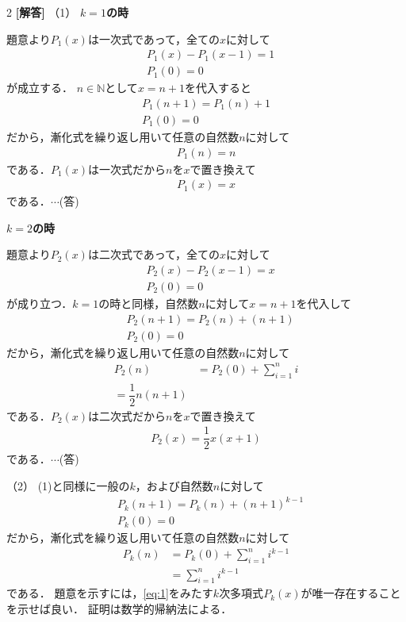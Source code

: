 \documentclass[../../main.tex]{subfiles}
\begin{document}
\setcounter{equation}{0}
\begin{oframed}
  
\end{oframed}
\setlength{\columnseprule}{0.4pt}
\begin{multicols}{2}
  {\bf [解答]}
  （1）
  \textbf{$k=1$の時}

  題意より$P_1(x)$は一次式であって，全ての$x$に対して
  \begin{align}
    & P_1(x) - P_1(x-1) = 1 \\
    & P_1(0) = 0
  \end{align}
  が成立する．
  $n \in \mathbb{N}$として$x=n+1$を代入すると
  \begin{align}
    P_1(n+1) = P_1(n) + 1 \\
    P_1(0) = 0
  \end{align}
  だから，漸化式を繰り返し用いて任意の自然数$n$に対して
  \begin{align}
    P_1(n) = n
  \end{align}
  である．$P_1(x)$は一次式だから$n$を$x$で置き換えて
  \begin{align}
    P_1(x) = x
  \end{align}
  である．$\cdots$(答)

  \textbf{$k=2$の時}

  題意より$P_2(x)$は二次式であって，全ての$x$に対して
  \begin{align}
    & P_2(x) - P_2(x-1) = x \\
    & P_2(0) = 0
  \end{align}
  が成り立つ．$k=1$の時と同様，自然数$n$に対して$x=n+1$を代入して
  \begin{align}
    & P_2(n+1) = P_2(n) + (n+1) \\
    & P_2(0) = 0
  \end{align}
  だから，漸化式を繰り返し用いて任意の自然数$n$に対して
  \begin{align}
    P_2(n)
    & = P_2(0) + \sum_{i=1}^{n} i \\
    = \dfrac{1}{2}n(n+1)
  \end{align}
  である．$P_2(x)$は二次式だから$n$を$x$で置き換えて
  \begin{align}
    P_2(x) = \dfrac{1}{2}x(x+1)
  \end{align}
  である．$\cdots$(答)

  （2）
  (1)と同様に一般の$k$，および自然数$n$に対して
  \begin{align}
    & P_k(n+1) = P_k(n) + (n+1)^{k-1} \\
    & P_k(0) = 0
  \end{align}
  だから，漸化式を繰り返し用いて任意の自然数$n$に対して
  \begin{align}
    P_k(n)
    & = P_k(0) + \sum_{i=1}^n i^{k-1}            \\
    & = \sum_{i=1}^n i^{k-1} \label{eq:1}
  \end{align}
  である．
  題意を示すには，\cref{eq:1}をみたす$k$次多項式$P_k(x)$が唯一存在することを示せば良い．
  証明は数学的帰納法による．


\end{multicols}
\end{document}
